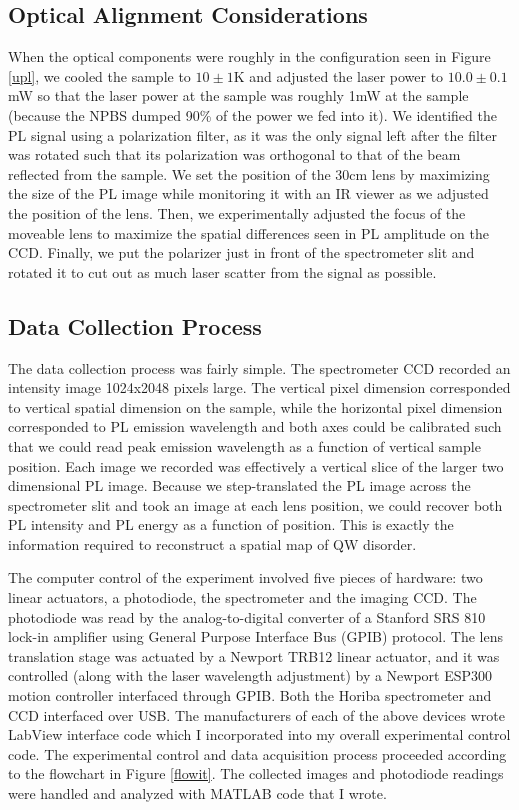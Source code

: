 \subsection{Optical Alignment Considerations}
\indent When the optical components were roughly in the configuration seen in Figure \ref{upl}, we cooled the sample to $10\pm1$K and adjusted the laser power to $10.0\pm0.1$mW so that the laser power at the sample was roughly 1mW at the sample (because the NPBS dumped 90\% of the power we fed into it). We identified the PL signal using a polarization filter, as it was the only signal left after the filter was rotated such that its polarization was orthogonal to that of the beam reflected from the sample. We set the position of the 30cm lens by maximizing the size of the PL image while monitoring it with an IR viewer as we adjusted the position of the lens. Then, we experimentally adjusted the focus of the moveable lens to maximize the spatial differences seen in PL amplitude on the CCD. Finally, we put the polarizer just in front of the spectrometer slit and rotated it to cut out as much laser scatter from the signal as possible.

\subsection{Data Collection Process}
\indent The data collection process was fairly simple. The spectrometer CCD recorded an intensity image 1024x2048 pixels large. The vertical pixel dimension corresponded to vertical spatial dimension on the sample, while the horizontal pixel dimension corresponded to PL emission wavelength and both axes could be calibrated such that we could read peak emission wavelength as a function of vertical sample position. Each image we recorded was effectively a vertical slice of the larger two dimensional PL image. Because we step-translated the PL image across the spectrometer slit and took an image at each lens position, we could recover both PL intensity and PL energy as a function of position. This is exactly the information required to reconstruct a spatial map of QW disorder. 

\indent The computer control of the experiment involved five pieces of hardware: two linear actuators, a photodiode, the spectrometer and the imaging CCD. The photodiode was read by the analog-to-digital converter of a Stanford SRS 810 lock-in amplifier using General Purpose Interface Bus (GPIB) protocol. The lens translation stage was actuated by a Newport TRB12 linear actuator, and it was controlled (along with the laser wavelength adjustment) by a Newport ESP300 motion controller interfaced through GPIB. Both the Horiba spectrometer and CCD interfaced over USB. The manufacturers of each of the above devices wrote LabView interface code which I incorporated into my overall experimental control code. The experimental control and data acquisition process proceeded according to the flowchart in Figure \ref{flowit}. The collected images and photodiode readings were handled and analyzed with MATLAB code that I wrote.




